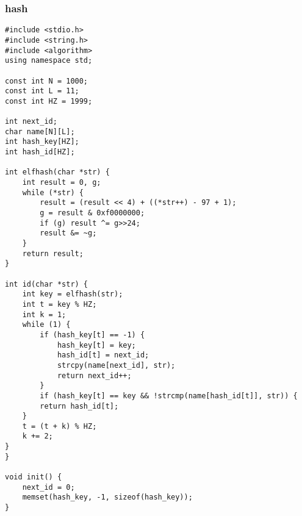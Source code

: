 \subsubsection{hash}
\begin{verbatim}
#include <stdio.h>
#include <string.h>
#include <algorithm>
using namespace std;

const int N = 1000;
const int L = 11;
const int HZ = 1999;

int next_id;
char name[N][L];
int hash_key[HZ];
int hash_id[HZ];

int elfhash(char *str) {
    int result = 0, g;
    while (*str) {
        result = (result << 4) + ((*str++) - 97 + 1);
        g = result & 0xf0000000;
        if (g) result ^= g>>24;
        result &= ~g;
    }
    return result;
}

int id(char *str) {
    int key = elfhash(str);
    int t = key % HZ;
    int k = 1;
    while (1) {
        if (hash_key[t] == -1) {
            hash_key[t] = key;
            hash_id[t] = next_id;
            strcpy(name[next_id], str);
            return next_id++;
        }
        if (hash_key[t] == key && !strcmp(name[hash_id[t]], str)) {
        return hash_id[t];
    }
    t = (t + k) % HZ;
    k += 2;
}
}

void init() {
    next_id = 0;
    memset(hash_key, -1, sizeof(hash_key));
}
\end{verbatim}
